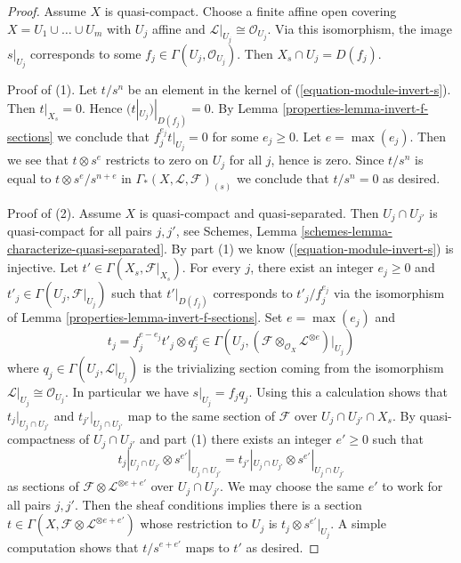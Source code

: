 \begin{proof}

Assume $X$ is quasi-compact. Choose a finite affine open covering
$X = U_1 \cup \ldots \cup U_m$ with $U_j$ affine and
$\mathcal{L}|_{U_j} \cong \mathcal{O}_{U_j}$. Via this isomorphism,
the image $s|_{U_j}$ corresponds to some
$f_j \in \Gamma(U_j, \mathcal{O}_{U_j})$. Then
$X_s \cap U_j = D(f_j)$.

\medskip\noindent
Proof of (1). Let $t/s^n$ be an element in the kernel of
(\ref{equation-module-invert-s}). Then $t|_{X_s} = 0$.
Hence $(t|_{U_j})|_{D(f_j)} = 0$. By
Lemma \ref{properties-lemma-invert-f-sections} we conclude that
$f_j^{e_j} t|_{U_j} = 0$ for some
$e_j \geq 0$. Let $e = \max(e_j)$. Then we see that $t \otimes s^e$
restricts to zero on $U_j$ for all $j$, hence is zero. Since $t/s^n$
is equal to $t \otimes s^e/s^{n + e}$ in
$\Gamma_*(X, \mathcal{L}, \mathcal{F})_{(s)}$ we conclude that $t/s^n = 0$
as desired.

\medskip\noindent
Proof of (2). Assume $X$ is quasi-compact and quasi-separated.
Then $U_j \cap U_{j'}$ is quasi-compact for all pairs $j, j'$, see
Schemes, Lemma \ref{schemes-lemma-characterize-quasi-separated}.
By part (1) we know (\ref{equation-module-invert-s}) is injective.
Let $t' \in \Gamma(X_s, \mathcal{F}|_{X_s})$. For every $j$, there exist an
integer $e_j \geq 0$ and $t'_j \in \Gamma(U_j, \mathcal{F}|_{U_j})$ such that
$t'|_{D(f_j)}$ corresponds to $t'_j/f_j^{e_j}$
via the isomorphism of Lemma \ref{properties-lemma-invert-f-sections}.
Set $e = \max(e_j)$ and
$$
t_j = f_j^{e - e_j} t'_j \otimes q_j^e \in
\Gamma(U_j,
(\mathcal{F} \otimes_{\mathcal{O}_X} \mathcal{L}^{\otimes e})|_{U_j})
$$
where $q_j \in \Gamma(U_j, \mathcal{L}|_{U_j})$ is the trivializing
section coming from the isomorphism
$\mathcal{L}|_{U_j} \cong \mathcal{O}_{U_j}$. In particular we have
$s|_{U_j} = f_j q_j$. Using this a calculation shows that
$t_j|_{U_j \cap U_{j'}}$ and $t_{j'}|_{U_j \cap U_{j'}}$
map to the same section of $\mathcal{F}$ over $U_j \cap U_{j'} \cap X_s$.
By quasi-compactness of $U_j \cap U_{j'}$ and part (1) there exists an
integer $e' \geq 0$ such that
$$
t_j|_{U_j \cap U_{j'}} \otimes s^{e'}|_{U_j \cap U_{j'}} =
t_{j'}|_{U_j \cap U_{j'}} \otimes s^{e'}|_{U_j \cap U_{j'}}
$$
as sections of $\mathcal{F} \otimes \mathcal{L}^{\otimes e + e'}$ over
$U_j \cap U_{j'}$. We may choose the same $e'$ to work for all pairs
$j, j'$. Then the sheaf conditions implies there is a section
$t \in \Gamma(X, \mathcal{F} \otimes \mathcal{L}^{\otimes e + e'})$
whose restriction to $U_j$ is $t_j \otimes s^{e'}|_{U_j}$.
A simple computation shows that $t/s^{e + e'}$ maps to $t'$
as desired.
\end{proof}


